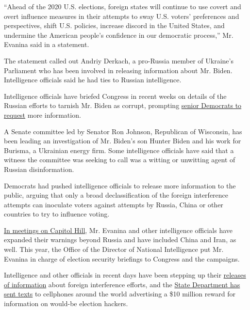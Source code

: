 ``Ahead of the 2020 U.S. elections, foreign states will continue to use
covert and overt influence measures in their attempts to sway U.S.
voters' preferences and perspectives, shift U.S. policies, increase
discord in the United States, and undermine the American people's
confidence in our democratic process,'' Mr. Evanina said in a statement.

The statement called out Andriy Derkach, a pro-Russia member of
Ukraine's Parliament who has been involved in releasing information
about Mr. Biden. Intelligence officials said he had ties to Russian
intelligence.

Intelligence officials have briefed Congress in recent weeks on details
of the Russian efforts to tarnish Mr. Biden as corrupt, prompting
\href{https://www.nytimes.com/2020/07/20/us/politics/congress-disinformation-biden-russia-ukraine.html}{senior
Democrats to request} more information.

A Senate committee led by Senator Ron Johnson, Republican of Wisconsin,
has been leading an investigation of Mr. Biden's son Hunter Biden and
his work for Burisma, a Ukrainian energy firm. Some intelligence
officials have said that a witness the committee was seeking to call was
a witting or unwitting agent of Russian disinformation.

Democrats had pushed intelligence officials to release more information
to the public, arguing that only a broad declassification of the foreign
interference attempts can inoculate voters against attempts by Russia,
China or other countries to try to influence voting.

\href{https://www.nytimes.com/2020/07/24/us/politics/election-interference-russia-china-iran.html}{In
meetings on Capitol Hill}, Mr. Evanina and other intelligence officials
have expanded their warnings beyond Russia and have included China and
Iran, as well. This year, the Office of the Director of National
Intelligence put Mr. Evanina in charge of election security briefings to
Congress and the campaigns.

Intelligence and other officials in recent days have been stepping up
their
\href{https://www.nytimes.com/2020/07/24/us/politics/election-interference-russia-china-iran.html}{releases
of information} about foreign interference efforts, and the
\href{https://www.nytimes.com/2020/08/06/us/politics/election-meddling-texts-russia-iran.html}{State
Department has sent texts} to cellphones around the world advertising a
\$10 million reward for information on would-be election hackers.

